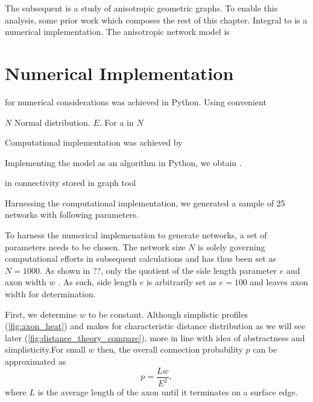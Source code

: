 The subsequent is a study of anisotropic geometric graphs. To enable
this analysis, some prior work which composes the rest of this
chapter. Integral to is a numerical implementation. The anisotropic
network model is 





\section{Numerical Implementation}\label{numerical_implementation}

for numerical considerations was achieved in Python. Using convenient 



$N$ Normal distribution. $E$. For a in $N$ 

Computational implementation was achieved by 




Implementing the model as an algorithm in Python, we obtain .

 in connectivity stored in graph
tool \parencite{graph_tool} %

Harnessing the computational implementation, we generated a sample of
25 networks with following parameters. 



To harness the numerical implemenation to generate networks, a set
of parameters needs to be chosen. The network size $N$ is solely
governing computational efforts in subsequent calculations and has
thus been set as $N = 1000$. As shown in ??, only the quotient of
the side length parameter $e$ and axon width $w$  . As such, side
length $e$ is arbitrarily set as $e = 100$ and leaves axon width for
determination. 

First, we determine $w$ to be constant. Although simplistic profiles
(\autoref{fig:axon_heat}) and makes for characteristic distance
distribution as we will see later
(\autoref{fig:distance_theory_compare}), more in line with idea of
abstractness and simplisticity.For small $w$ then, the overall
connection probability $p$ can be approximated as
\[
p = \frac{L w}{E^2},
\]
where $L$ is the average length of the axon until it terminates on a
surface edge. 

